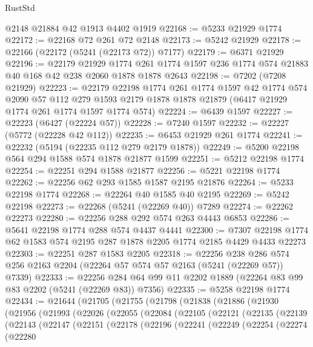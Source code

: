 \begin{lexlean}{RustStd}
\begin{coremodule}
{\begin{coremodule}
{{{{{{{{{{{{{{{{{{{{{{{{{{{{{    @2148
    @21884
    @42
    @1913
    @4402
    @1919
@22168 := @5233 @21929 @1774
@22172 := @22168 @72 @261 @72 @2148
@22173 := @5242 @21929
@22178 := @22166 (@22172 (@5241 (@22173 @72)) @7177)
@22179 := @6371 @21929
@22196 := @22179
    @21929
    @1774
    @261
    @1774
    @1597
    @236
    @1774
    @574
    @21883
    @40
    @168
    @42
    @238
    @2060
    @1878
    @1878
    @2643
@22198 := @7202 (@7208 @21929)
@22223 := @22179
    @22198
    @1774
    @261
    @1774
    @1597
    @42
    @1774
    @574
    @2090
    @57
    @112
    @279
    @1593
    @2179
    @1878
    @1878
    @21879
    (@6417 @21929 @1774 @261 @1774 @1597 @1774 @574)
@22224 := @6439 @1597
@22227 := @22223 (@6427 (@22224 @57))
@22228 := @7240 @1597
@22232 := @22227 (@5772 (@22228 @42 @112))
@22235 := @6453 @21929 @261 @1774
@22241 := @22232 (@5194 (@22235 @112 @279 @2179 @1878))
@22249 := @5200 @22198 @564 @294 @1588 @574 @1878 @21877 @1599
@22251 := @5212 @22198 @1774
@22254 := @22251 @294 @1588 @21877
@22256 := @5221 @22198 @1774
@22262 := @22256 @62 @293 @1585 @1587 @2195 @21876
@22264 := @5233 @22198 @1774
@22268 := @22264 @40 @1585 @40 @2195
@22269 := @5242 @22198
@22273 := @22268 (@5241 (@22269 @40)) @7289
@22274 := @22262 @22273
@22280 := @22256 @288 @292 @574 @263 @4443 @6853
@22286 := @5641 @22198 @1774 @288 @574 @4437 @4441
@22300 := @7307 @22198 @1774 @62 @1583 @574 @2195 @287 @1878 @2205 @1774 @2185 @4429 @4433 @22273
@22303 := @22251 @287 @1583 @2205
@22318 := @22256
    @238
    @286
    @574
    @256
    @2163
    @2204
    (@22264 @57 @574 @57 @2163 (@5241 (@22269 @57)) @7339)
@22333 := @22256 @284 @64 @99 @11 @2202 @1889 (@22264 @83 @99 @83 @2202 (@5241 (@22269 @83)) @7356)
@22335 := @5258 @22198 @1774
@22434 := @21644
    (@21705
      (@21755
        (@21798
          (@21838
            (@21886
              (@21930
                (@21956
                  (@21993
                    (@22026
                      (@22055
                        (@22084
                          (@22105
                            (@22121
                              (@22135
                                (@22139
                                  (@22143
                                    (@22147
                                      (@22151
                                        (@22178
                                          (@22196
                                            (@22241
                                              (@22249
                                                (@22254
                                                  (@22274
                                                    (@22280
}}}}}}}}}}}}}}}}}}}}}}}}}}}}}
\end{coremodule}}
\end{coremodule}
\end{lexlean}

